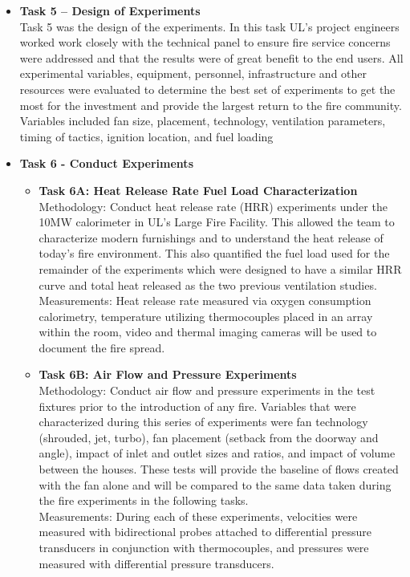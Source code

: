 \documentclass{article}
\begin{document}
\begin{itemize}
	\item \textbf{Task 5 – Design of Experiments} \\
	Task 5 was the design of the experiments. In this task UL’s project engineers worked work closely with the technical panel to ensure fire service concerns were addressed and that the results were of great benefit to the end users. All experimental variables, equipment, personnel, infrastructure and other resources were evaluated to determine the best set of experiments to get the most for the investment and provide the largest return to the fire community. Variables included fan size, placement, technology, ventilation parameters, timing of tactics, ignition location, and fuel loading
	
	\item \textbf{Task 6 - Conduct Experiments} \\
	\begin{itemize}
		\item \textbf{Task 6A: Heat Release Rate Fuel Load Characterization} \\
		Methodology: Conduct heat release rate (HRR) experiments under the 10MW calorimeter in UL’s Large Fire Facility. This allowed the team to characterize modern furnishings and to understand the heat release of today’s fire environment. This also quantified the fuel load used for the remainder of the experiments which were designed to have a similar HRR curve and total heat released as the two previous ventilation studies. \\
		\vspace{\baselineskip}
		Measurements: Heat release rate measured via oxygen consumption calorimetry, temperature utilizing thermocouples placed in an array within the room, video and thermal imaging cameras will be used to document the fire spread.
		
		\item \textbf{Task 6B: Air Flow and Pressure Experiments} \\
		Methodology: Conduct air flow and pressure experiments in the test fixtures prior to the introduction of any fire. Variables that were characterized during this series of experiments were fan technology (shrouded, jet, turbo), fan placement (setback from the doorway and angle), impact of inlet and outlet sizes and ratios, and impact of volume between the houses. These tests will provide the baseline of flows created with the fan alone and will be compared to the same data taken during the fire experiments in the following tasks.\\
		\vspace*{\baselineskip}
		Measurements: During each of these experiments, velocities were measured with bidirectional probes attached to differential pressure transducers in conjunction with thermocouples, and pressures were measured with differential pressure transducers.
		

\end{itemize}
\end{itemize}
\end{document}
